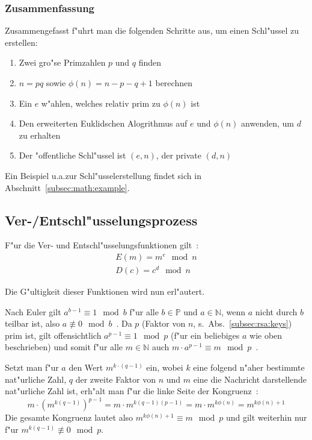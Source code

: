 \documentclass[12pt]{article}
\begin{document}
\subsubsection{Zusammenfassung}

Zusammengefasst f"uhrt man die folgenden Schritte aus, um einen Schl"ussel zu erstellen:

\begin{enumerate}
    \item Zwei gro"se Primzahlen $p$ und $q$ finden
    \item $n = pq$ sowie $\phi(n) = n - p - q + 1$ berechnen
    \item Ein $e$ w"ahlen, welches relativ prim zu $\phi(n)$ ist
    \item Den erweiterten Euklidschen Alogrithmus auf $e$ und $\phi(n)$ anwenden, um $d$ zu erhalten
    \item Der "offentliche Schl"ussel ist $(e, n)$, der private $(d, n)$
\end{enumerate}

\noindent
Ein Beispiel u.a.\@ zur Schl"usselerstellung findet sich in Abschnitt~\ref{subsec:math:example}.

\subsection{Ver-/Entschl"usselungsprozess}
F"ur die Ver- und Entschl"usselungsfunktionen gilt~\cite{rsa}:
\[
\begin{aligned}
E(m) = m^e \mod n \\
D(c) = c^d \mod n
\end{aligned}
\]

\noindent
Die G"ultigkeit dieser Funktionen wird nun erl"autert.

Nach Euler gilt $a^{b-1} \equiv 1 \mod b$ f"ur alle $b \in \mathbb{P}$ und $a \in \mathbb{N}$,
wenn $a$ nicht durch $b$ teilbar ist, also $a \not\equiv 0 \mod b$~\cite{euler41}.
Da $p$ (Faktor von $n$, s.~Abs.~\ref{subsec:rsa:keys}) prim ist,
gilt offensichtlich $a^{p-1} \equiv 1 \mod p$
(f"ur ein beliebiges $a$ wie oben beschrieben) und somit f"ur alle $m \in \mathbb{N}$ auch
$m \cdot a^{p-1} \equiv m \mod p$~\cite{rsa}.

Setzt man f"ur $a$ den Wert $m^{k \cdot (q-1)}$ ein,
wobei $k$ eine folgend n"aher bestimmte nat"urliche Zahl, $q$ der zweite Faktor von $n$
und $m$ eine die Nachricht darstellende nat"urliche Zahl ist,
erh"alt man f"ur die linke Seite der Kongruenz~\cite{rsa}:
\[
    m \cdot \left(m^{k(q-1)}\right)^{p-1} = m \cdot m^{k(q-1)(p-1)} = m \cdot m^{k\phi(n)} = m^{k\phi(n) + 1}
\]
Die gesamte Kongruenz lautet also $m^{k\phi(n)+1} \equiv m \mod p$ und
gilt weiterhin nur f"ur $m^{k(q-1)} \not\equiv 0 \mod p$.
\end{document}
